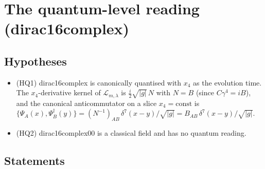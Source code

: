 \documentclass[11pt]{article}
\begin{document}
\section{The quantum-level reading (dirac16complex)}

\subsection{Hypotheses}

\begin{itemize}
\item (HQ1) dirac16complex is canonically quantised with $x_4$ as the evolution time. The $x_4$-derivative kernel of $\mathcal{L}_{m,\lambda}$ is $\frac{i}{2}\sqrt{|g|}\,N$ with $N = B$ (since $C\gamma^4 = iB$), and the canonical anticommutator on a slice $x_4 = \mathrm{const}$ is $\{\Psi_A(x), \Psi^\dagger_B(y)\} = (N^{-1})_{AB}\,\delta^7(x - y)/\sqrt{|g|} = B_{AB}\,\delta^7(x - y)/\sqrt{|g|}$.
\item (HQ2) dirac16complex00 is a classical field and has no quantum reading.
\end{itemize}

\subsection{Statements}
\end{document}
